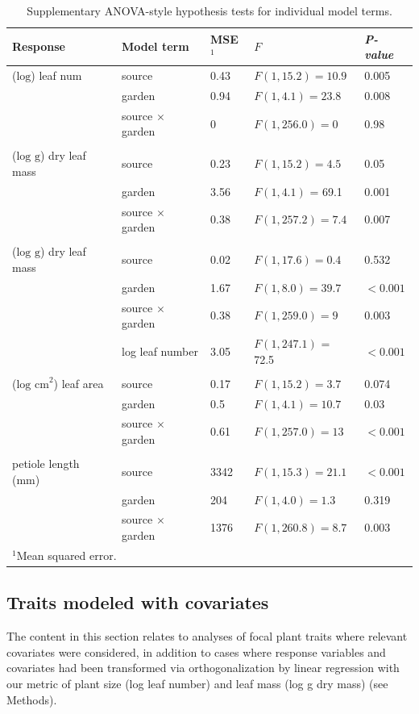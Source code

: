\documentclass[11pt, oneside]{amsart}
\begin{document}
\begin{table}[htp]
\small
\caption{Supplementary ANOVA-style hypothesis tests for individual model terms.}
\centering
\begin{tabular}{lllll}
\toprule
Response & Model term & MSE$^1$ & $F$ & \emph{P-value}\\
\midrule
($\text{log}$) leaf num & source & 0.43 & $F(1,15.2) = 10.9$ & 0.005\\
 & garden & 0.94 & $F(1,4.1) = 23.8$ & 0.008\\
 & source $\times$ garden & 0 & $F(1,256.0) = 0$ & 0.98\\
  & & & &\\
($\text{log g}$) dry leaf mass & source & 0.23 & $F(1,15.2) = 4.5$ & 0.05\\
 & garden & 3.56 & $F(1,4.1)$ = 69.1 & 0.001\\
 & source $\times$ garden & 0.38 & $F(1,257.2) = 7.4$ & 0.007\\
& & & &\\
($\text{log g}$) dry leaf mass & source & 0.02 & $F(1,17.6) = 0.4$ & 0.532\\
 & garden & 1.67 & $F(1,8.0) = 39.7$ & $<0.001$\\
 & source $\times$ garden & 0.38 & $F(1,259.0) = 9$ & 0.003\\
 & log leaf number & 3.05 & $F(1,247.1)$ = 72.5 & $<0.001$\\
& & & &\\
($\text{log cm}^{2}$) leaf area & source & 0.17 & $F(1,15.2) = 3.7$ & 0.074\\
 & garden & 0.5 & $F(1,4.1) = 10.7$ & 0.03\\
 & source $\times$ garden & 0.61 & $F(1,257.0) = 13$ & $<0.001$\\
& & & &\\
petiole length (mm) & source & 3342 & $F(1,15.3) = 21.1$ & $<0.001$\\
 & garden & 204 & $F(1,4.0) = 1.3$ & 0.319\\
 & source $\times$ garden & 1376 & $F(1,260.8) = 8.7$ & 0.003\\
\bottomrule
\multicolumn{5}{l}{$^{1}$Mean squared error.} \\ 
\end{tabular}
\label{tableS5}
\end{table}

\vspace{1cm}

\subsection{Traits modeled with covariates}
The content in this section relates to analyses of focal plant traits where relevant covariates were considered, in addition to cases where response variables and covariates had been transformed via orthogonalization by linear regression with our metric of plant size (log leaf number) and leaf mass (log g dry mass) (see Methods). 
\end{document}
